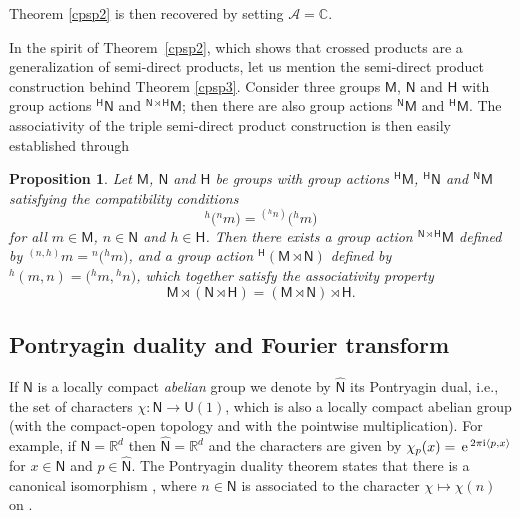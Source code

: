 \documentclass[10pt,a4paper]{amsart}
\numberwithin{equation}{section}
\def\ii{{{\rm i}}}
\newcommand{\sfH}{\mathsf{H}}
\newcommand{\sfN}{\mathsf{N}}
\newcommand{\sfM}{\mathsf{M}}
\newcommand{\sfU}{\mathsf{U}}
\newcommand{\complex}{{\mathbb C}} %
\newcommand{\real}{{\mathbb R}} %
\def\alg{{\mathcal A}}
\def\e{{\,\rm e}\,}
\newtheorem{Proposition}[Theorem]{Proposition}
 { \theoremstyle{definition}
\newtheorem{Definition}[Theorem]{Definition}
\newtheorem{Note}[Theorem]{Note}
\newtheorem{Example}[Theorem]{Example}
\newtheorem{Remark}[Theorem]{Remark} }
\begin{document}
Theorem \ref{cpsp2} is then recovered by setting $\alg=\complex$.

In the spirit of Theorem~\ref{cpsp2},
 which shows that crossed products are a generalization of
 semi-direct products, let us mention the semi-direct
 product construction behind Theorem \ref{cpsp3}. Consider three groups $\sfM $, $\sfN $ and $\sfH $ with group actions ${}^\sfH \sfN $ and
${}^{\sfN \rtimes \sfH }\sfM $; then there are also group actions
${}^\sfN \sfM $ and ${}^\sfH \sfM $. The associativity
of the triple semi-direct product construction is then easily established
through
\begin{Proposition}\label{MNH}
Let $\sfM $, $\sfN $ and $\sfH $ be groups with group actions ${}^\sfH \sfM $, ${}^\sfH \sfN $ and
${}^\sfN \sfM $ satisfying the compatibility conditions
\[
{}^h\big({}^nm\big) = {}^{({}^hn)}\big({}^hm\big)
\]
for all $m\in \sfM $, $n\in \sfN $ and $h\in \sfH $. Then there exists a group
action ${}^{\sfN \rtimes \sfH }\sfM $ defined by ${}^{(n,h)}m={}^n\big({}^hm\big)$, and a
group action ${}^\sfH (\sfM \rtimes \sfN )$ defined by ${}^h(m,n)=\big({}^hm,{}^hn\big)$,
which together satisfy the associativity property
\[
\sfM \rtimes(\sfN \rtimes \sfH ) = (\sfM \rtimes \sfN )\rtimes \sfH .
\]
\end{Proposition}

\subsection{Pontryagin duality and Fourier transform}

If $\sfN $ is a locally compact {\sl abelian} group we denote by $\widehat{\sfN }$
its Pontryagin dual, i.e., the set of characters $\chi\colon \sfN \to \sfU(1)$,
which is also a locally compact abelian group (with the compact-open
topology and with the pointwise multiplication). For example, if
$\sfN =\real^d$ then $\widehat{\sfN }=\real^d$ and the characters are given by
$\chi_p(x)=\e^{2\pi\ii \langle p, x\rangle}$ for $x\in \sfN $ and
$p\in\widehat{\sfN }$. The Pontryagin duality theorem states that there is a
canonical isomorphism \smash{$\widehat{\widehat{\sfN }}\simeq \sfN $}, where
$n\in\sfN$ is associated to the character $\chi\mapsto\chi(n)$ on
\smash{$\widehat\sfN$}.
\end{document}
